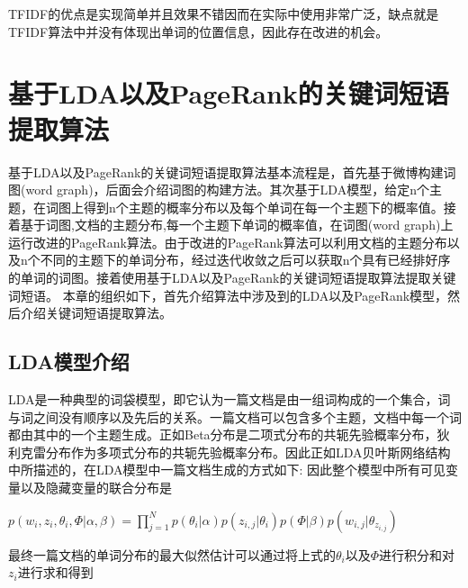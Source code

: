 \documentclass[master]{njuthesis}
\begin{document}
TFIDF的优点是实现简单并且效果不错因而在实际中使用非常广泛，缺点就是TFIDF算法中并没有体现出单词的位置信息，因此存在改进的机会。

\section{基于LDA以及PageRank的关键词短语提取算法}

基于LDA以及PageRank的关键词短语提取算法基本流程是，首先基于微博构建词图(word graph)，后面会介绍词图的构建方法。其次基于LDA模型，给定n个主题，在词图上得到n个主题的概率分布以及每个单词在每一个主题下的概率值。接着基于词图,文档的主题分布,每一个主题下单词的概率值，在词图(word graph)上运行改进的PageRank算法。由于改进的PageRank算法可以利用文档的主题分布以及n个不同的主题下的单词分布，经过迭代收敛之后可以获取n个具有已经排好序的单词的词图。接着使用基于LDA以及PageRank的关键词短语提取算法提取关键词短语。
本章的组织如下，首先介绍算法中涉及到的LDA以及PageRank模型，然后介绍关键词短语提取算法。

\subsection{LDA模型介绍}

    LDA是一种典型的词袋模型，即它认为一篇文档是由一组词构成的一个集合，词与词之间没有顺序以及先后的关系。一篇文档可以包含多个主题，文档中每一个词都由其中的一个主题生成。正如Beta分布是二项式分布的共轭先验概率分布，狄利克雷分布作为多项式分布的共轭先验概率分布。因此正如LDA‎贝叶斯网络结构中所描述的，在LDA模型中一篇文档生成的方式如下:
    因此整个模型中所有可见变量以及隐藏变量的联合分布是

    $p(w_i, z_i, \theta_i, \Phi | \alpha, \beta) = \prod_{j = 1}^{N} p(\theta_i|\alpha)p(z_{i, j}|\theta_i)p(\Phi|\beta)p(w_{i, j}|\theta_{z_{i, j}})$

    最终一篇文档的单词分布的最大似然估计可以通过将上式的$\theta_i$以及$\Phi$进行积分和对$z_i$进行求和得到
\end{document}
